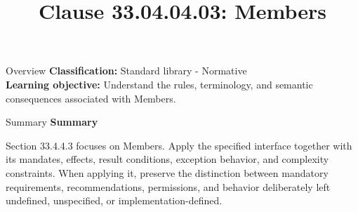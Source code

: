 \documentclass[10pt,letterpaper]{article}
\title{Clause 33.04.04.03: Members}
\author{}
\date{}
\begin{document}
\maketitle
\begin{CornellOverviewBox}{Overview}
\textbf{Classification:} Standard library - Normative\\[2pt]
\textbf{Learning objective:} Understand the rules, terminology, and semantic consequences associated with Members.
\end{CornellOverviewBox}\begin{CornellSummaryBox}{Summary}
{\sffamily\bfseries\color{Accent} Summary}\par\vspace{3pt}Section 33.4.4.3 focuses on Members. Apply the specified interface together with its mandates, effects, result conditions, exception behavior, and complexity constraints. When applying it, preserve the distinction between mandatory requirements, recommendations, permissions, and behavior deliberately left undefined, unspecified, or implementation-defined.
\end{CornellSummaryBox}
\end{document}
